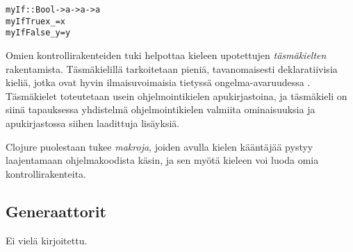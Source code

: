 \begin{alltt}
% Käyttö: myIf condition onTrue onFalse
myIf :: Bool -> a -> a -> a
myIf True  x _ = x
myIf False _ y = y
\end{alltt}

Omien kontrollirakenteiden tuki helpottaa kieleen upotettujen \textit{täsmäkielten} rakentamista. Täsmäkielillä tarkoitetaan pieniä, tavanomaisesti deklaratiivisia kieliä, jotka ovat hyvin ilmaisuvoimaisia tietyssä ongelma-avaruudessa \citep{van2000domain}. Täsmäkielet toteutetaan usein ohjelmointikielen apukirjastoina, ja täsmäkieli on siinä tapauksessa yhdistelmä ohjelmointikielen valmiita ominaisuuksia ja apukirjastossa siihen laadittuja lisäyksiä.

Clojure puolestaan tukee \textit{makroja}, joiden avulla kielen kääntäjää pystyy laajentamaan ohjelmakoodista käsin, ja sen myötä kieleen voi luoda omia kontrollirakenteita.

\subsection{Generaattorit}

Ei vielä kirjoitettu.

